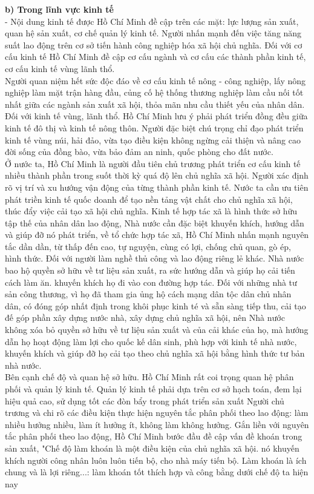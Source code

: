\documentclass[12pt,a4paper]{article}
\begin{document}
\textbf{b) Trong lĩnh vực kinh tế}\\
- Nội dung kinh tế được Hồ Chí Minh đề cập trên các mặt: lực lượng sản xuất, quan hệ sản xuất, cơ chế quản lý kinh tế. Người nhấn mạnh đến việc tăng năng suất lao động trên cơ sở tiến hành công nghiệp hóa xã hội chủ nghĩa. Đối với cơ cấu kinh tế Hồ Chí Minh đề cập cơ cấu ngành và cơ cấu các thành phần kinh tế, cơ cấu kinh tế vùng lãnh thổ.\\
Người quan niệm hết sức độc đáo về cơ cấu kinh tế nông - công nghiệp, lấy nông nghiệp làm mặt trận hàng đầu, củng cố hệ thống thương nghiệp làm cầu nối tốt nhất giữa các ngành sản xuất xã hội, thỏa mãn nhu cầu thiết yếu của nhân dân.\\
Đối với kinh tế vùng, lãnh thổ. Hồ Chí Minh lưu ý phải phát triển đồng đều giữa kinh tế đô thị và kinh tế nông thôn. Người đặc biệt chú trọng chỉ đạo phát triển kinh tế vùng núi, hải đảo, vừa tạo điều kiện không ngừng cải thiện và nâng cao đời sống của đồng bào, vừa bảo đảm an ninh, quốc phòng cho đất nước.\\
Ở nước ta, Hồ Chí Minh là người đầu tiên chủ trương phát triển cơ cấu kinh tế nhiều thành phần trong suốt thời kỳ quá độ lên chủ nghĩa xã hội. Người xác định rõ vị trí và xu hướng vận động của từng thành phần kinh tế. Nước ta cần ưu tiên phát triền kinh tế quốc doanh để tạo nền tảng vật chất cho chủ nghĩa xã hội, thúc đẩy việc cải tạo xã hội chủ nghĩa. Kinh tế hợp tác xã là hình thức sở hữu tập thế của nhân dân lao động, Nhà nước cần đặc biệt khuyến khích, hướng dẫn và giúp đỡ nó phát triển, về tổ chức hợp tác xã, Hồ Chí Minh nhấn mạnh nguyên tắc dần dần, từ thấp đến cao, tự nguyện, cùng có lợi, chống chủ quan, gò ép, hình thức. Đối với người làm nghề thủ công và lao động riêng lẻ khác. Nhà nước bao hộ quyền sở hữu về tư liệu sản xuất, ra sức hướng dẫn và giúp họ cải tiến cách làm ăn. khuyến khích họ đi vào con đường hợp tác. Đối với những nhà tư sản công thương, vì họ đã tham gia ủng hộ cách mạng dân tộc dân chủ nhân dân, có đóng góp nhất định trong khôi phục kinh té và sẵn sàng tiếp thu, cải tạo đế góp phần xây dựng nước nhà, xây dựng chủ nghĩa xã hội, nên Nhà nước không xóa bỏ quyền sở hữu về tư liệu sản xuất và của cải khác của họ, mà hướng dẫn họ hoạt động làm lợi cho quốc kế dân sinh, phù hợp với kinh tế nhà nước, khuyến khích và giúp đỡ họ cải tạo theo chủ nghĩa xã hội bằng hình thức tư bản nhà nước.\\
Bên cạnh chế độ và quan hệ sở hữu. Hồ Chí Minh rất coi trọng quan hệ phân phối và quản lý kinh tế. Quản lý kinh tế phải dựa trên cơ sở hạch toán, đem lại hiệu quả cao, sử dụng tốt các đòn bẩy trong phát triển sản xuất Người chủ trương và chi rõ các điều kiện thực hiện nguyên tắc phân phối theo lao động: làm nhiều hưởng nhiều, làm ít hưởng ít, không làm không hưởng. Gắn liền với nguyên tắc phân phối theo lao động, Hồ Chí Minh bước đầu đề cập vấn đề khoán trong sản xuất, "Chế độ làm khoán là một điều kiện của chủ nghĩa xã hội. nó khuyến khích người công nhân luôn luôn tiến bộ, cho nhà máy tiến bộ. Làm khoán là ích chung và là lợi riêng...: làm khoán tốt thích hợp và công bằng dưới chế độ ta hiện nay\\[0.5cm]
\end{document}
